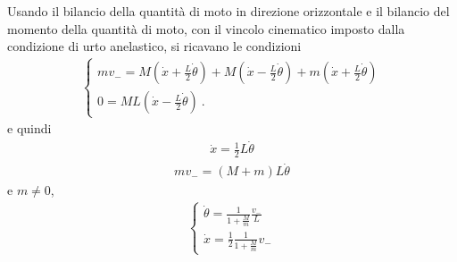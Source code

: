 \documentclass[letterpaper,10pt,italian]{jupyterBook}
\begin{document}
\sphinxAtStartPar
{} Usando il bilancio della quantità di moto in direzione orizzontale e il bilancio del momento della quantità di moto, con il vincolo cinematico imposto dalla condizione di urto anelastico, si ricavano le condizioni
\begin{equation*}
\begin{split}\begin{cases}
 m v_- = M ( \dot{x} + \frac{L}{2} \dot{\theta}) + M ( \dot{x} - \frac{L}{2} \dot{\theta}) +  m ( \dot{x} + \frac{L}{2} \dot{\theta}) \\
   0   = M L ( \dot{x} - \frac{L}{2} \dot{\theta}) \ .
\end{cases}\end{split}
\end{equation*}
\sphinxAtStartPar
e quindi
\begin{equation*}
\begin{split}\dot{x} = \frac{1}{2} L \dot{\theta}\end{split}
\end{equation*}\begin{equation*}
\begin{split}m v_- = (M + m)  L \dot{\theta}\end{split}
\end{equation*}
\sphinxAtStartPar
e  \(m \ne 0\),
\begin{equation*}
\begin{split}\begin{cases}
  \dot{\theta} = \frac{1}{1 + \frac{M}{m}} \frac{v_-}{L} \\
  \dot{x}      = \frac{1}{2} \frac{1}{1 + \frac{M}{m}} v_-
\end{cases}\end{split}
\end{equation*}
\end{document}
